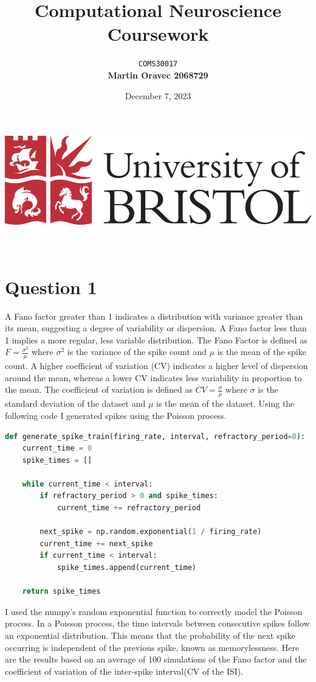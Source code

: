 \documentclass[11pt]{article}
\title{\huge\bfseries Computational Neuroscience Coursework}
\author{
    \texttt{\Large COMS30017}\\[4ex]
    \bfseries Martin Oravec 2068729
}
\date{December 7, 2023}
\begin{document}
\makeatletter
    \begin{titlepage}
        \begin{center}
            \includegraphics[width=0.35\linewidth]{UoB_Logo.png}\\[40ex]
            {\huge \bfseries  \@title }\\[4ex] 
            {\LARGE  \@author}\\[60ex] 
            {\large \@date}
        \end{center}
    \end{titlepage}
\makeatother
\newpage

\section*{Question 1} \label{question 1}
A Fano factor greater than 1 indicates a distribution with variance greater than its mean, suggesting a degree of variability or dispersion. A Fano factor less than 1 implies a more regular, less variable distribution. The Fano Factor is defined as $F = \frac{\sigma^2}{\mu}$ where \( \sigma^2 \) is the variance of the spike count and \( \mu \) is the mean of the spike count.
A higher coefficient of variation (CV) indicates a higher level of dispersion around the mean, whereas a lower CV indicates less variability in proportion to the mean. The coefficient of variation is defined as $CV = \frac{\sigma}{\mu}$ where \( \sigma \) is the standard deviation of the dataset and \( \mu \) is the mean of the dataset.
Using the following code I generated spikes using the Poisson process.

\begin{lstlisting}[language=Python]
def generate_spike_train(firing_rate, interval, refractory_period=0):
    current_time = 0
    spike_times = []
    
    while current_time < interval:
        if refractory_period > 0 and spike_times:
            current_time += refractory_period
            
        next_spike = np.random.exponential(1 / firing_rate)
        current_time += next_spike
        if current_time < interval:
            spike_times.append(current_time)

    return spike_times
\end{lstlisting}
I used the numpy's random exponential function to correctly model the Poisson process. In a Poisson process, the time intervals between consecutive spikes follow an exponential distribution. This means that the probability of the next spike occurring is independent of the previous spike, known as memorylessness. Here are the results based on an average of 100 simulations of the Fano factor and the coefficient of variation of the inter-spike interval(CV of the ISI).
\end{document}
